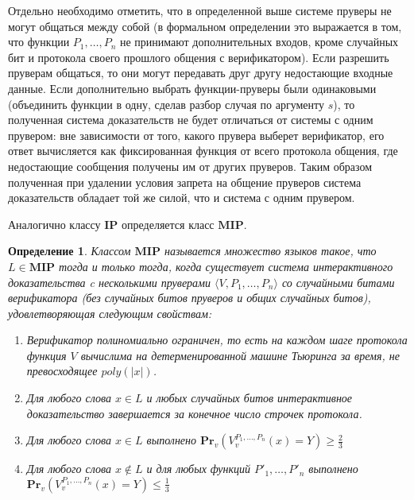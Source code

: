 \documentclass[14pt, a4paper, russian]{report}
\newtheorem{definition}{\indent Определение}
\newcommand{\poly}{\textit{poly}}
\newcommand{\pr}[2]{\textbf{Pr}_{#1}\left(#2\right)}
\begin{document}
Отдельно необходимо отметить, что в определенной выше системе пруверы не могут общаться между собой (в формальном определении это выражается в том, что функции $P_1, \dots, P_n$ не принимают дополнительных входов, кроме случайных бит и протокола своего прошлого общения с верификатором). Если разрешить пруверам общаться, то они могут передавать друг другу недостающие входные данные. Если дополнительно выбрать функции-пруверы были одинаковыми (объединить функции в одну, сделав разбор случая по аргументу $s$), то полученная система доказательств не будет отличаться от системы с одним прувером: вне зависимости от того, какого прувера выберет верификатор, его ответ вычисляется как фиксированная функция от всего протокола общения, где недостающие сообщения получены им от других пруверов. Таким образом полученная при удалении условия запрета на общение пруверов система доказательств обладает той же силой, что и система с одним прувером.

Аналогично классу $\textbf{IP}$ определяется класс $\textbf{MIP}$.

\begin{definition}\label{mip}
    Классом $\textbf{MIP}$ называется множество языков такое, что $L \in \textbf{MIP}$ тогда и только тогда, когда существует система интерактивного доказательства c несколькими пруверами $\langle V, P_1, \ldots, P_n\rangle$ со случайными битами верификатора (без случайных битов пруверов и общих случайных битов), удовлетворяющая следующим свойствам:
    \begin{enumerate}
        \item Верификатор полиномиально ограничен, то есть на каждом шаге протокола функция $V$ вычислима на детерменированной машине Тьюринга за время, не превосходящее $\poly(|x|)$.
        \item Для любого слова $x \in L$ и любых случайных битов интерактивное доказательство завершается за конечное число строчек протокола.
        \item Для любого слова $x \in L$ выполнено $\pr{v}{V^{P_1, \ldots, P_n}_{v}(x) = Y} \geq \frac{2}{3}$
        \item Для любого слова $x \notin L$ и для любых функций $P'_1, \ldots, P'_n$ выполнено\\$\pr{v}{V^{P_1, \ldots, P_n}_{v}(x) = Y} \leq \frac{1}{3}$
    \end{enumerate}
\end{definition}
\end{document}
